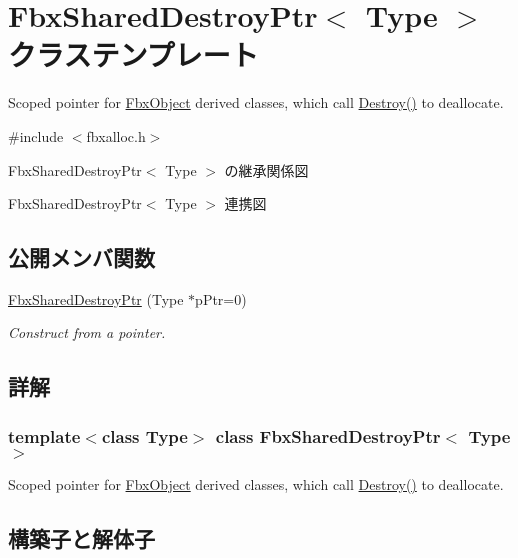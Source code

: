 \hypertarget{class_fbx_shared_destroy_ptr}{}\section{Fbx\+Shared\+Destroy\+Ptr$<$ Type $>$ クラステンプレート}
\label{class_fbx_shared_destroy_ptr}


Scoped pointer for \hyperlink{class_fbx_object}{Fbx\+Object} derived classes, which call \hyperlink{class_fbx_shared_ptr_a706fe3ede6f8a43589348169f4803c75}{Destroy()} to deallocate.  




{\ttfamily \#include $<$fbxalloc.\+h$>$}



Fbx\+Shared\+Destroy\+Ptr$<$ Type $>$ の継承関係図


Fbx\+Shared\+Destroy\+Ptr$<$ Type $>$ 連携図
\subsection*{公開メンバ関数}
\begin{DoxyCompactItemize}
\item 
\hyperlink{class_fbx_shared_destroy_ptr_a5868fc6cf021e68d1100c9aaaf6bf7e7}{Fbx\+Shared\+Destroy\+Ptr} (Type $\ast$p\+Ptr=0)
\begin{DoxyCompactList}\small\item\em Construct from a pointer. \end{DoxyCompactList}\end{DoxyCompactItemize}


\subsection{詳解}
\subsubsection*{template$<$class Type$>$\newline
class Fbx\+Shared\+Destroy\+Ptr$<$ Type $>$}

Scoped pointer for \hyperlink{class_fbx_object}{Fbx\+Object} derived classes, which call \hyperlink{class_fbx_shared_ptr_a706fe3ede6f8a43589348169f4803c75}{Destroy()} to deallocate. 

\subsection{構築子と解体子}
\mbox{\label{class_fbx_shared_destroy_ptr_a5868fc6cf021e68d1100c9aaaf6bf7e7}} 
